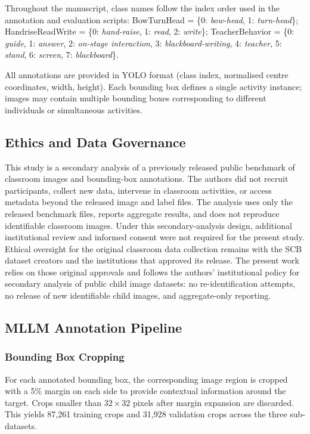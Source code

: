 \documentclass[10pt,letterpaper]{article}
\begin{document}
Throughout the manuscript, class names follow the index order used in
the annotation and evaluation scripts:
BowTurnHead = \{0: \textit{bow-head}, 1: \textit{turn-head}\};
HandriseReadWrite = \{0: \textit{hand-raise}, 1: \textit{read},
2: \textit{write}\};
TeacherBehavior = \{0: \textit{guide}, 1: \textit{answer},
2: \textit{on-stage interaction}, 3: \textit{blackboard-writing},
4: \textit{teacher}, 5: \textit{stand}, 6: \textit{screen},
7: \textit{blackboard}\}.

All annotations are provided in YOLO format (class index, normalised
centre coordinates, width, height).
Each bounding box defines a single activity instance; images may
contain multiple bounding boxes corresponding to different individuals
or simultaneous activities.

\subsection*{Ethics and Data Governance}

This study is a secondary analysis of a previously released public
benchmark of classroom images and bounding-box annotations.
The authors did not recruit participants, collect new data, intervene
in classroom activities, or access metadata beyond the released image
and label files.
The analysis uses only the released benchmark files, reports aggregate
results, and does not reproduce identifiable classroom images.
Under this secondary-analysis design, additional institutional review
and informed consent were not required for the present study.
Ethical oversight for the original classroom data collection remains
with the SCB dataset creators and the institutions that approved its
release.
The present work relies on those original approvals and follows the
authors' institutional policy for secondary analysis of public child
image datasets: no re-identification attempts, no release of new
identifiable child images, and aggregate-only reporting.

\subsection*{MLLM Annotation Pipeline}
\label{sec:annotation}

\subsubsection*{Bounding Box Cropping}

For each annotated bounding box, the corresponding image region is
cropped with a 5\% margin on each side to provide contextual
information around the target.
Crops smaller than $32 \times 32$ pixels after margin expansion are
discarded.
This yields 87{,}261 training crops and 31{,}928 validation crops
across the three sub-datasets.
\end{document}
